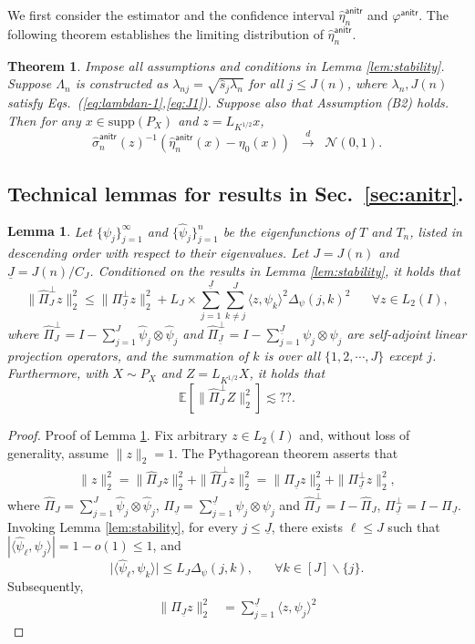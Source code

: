 \documentclass[11pt,a4paper]{article}
\renewcommand{\hat}{\widehat}
\theoremstyle{definition}
\theoremstyle{plain}
\newtheorem{theorem}{Theorem}[section]
\newtheorem{lemma}{Lemma}[section]
\theoremstyle{remark}
\newcommand{\supp}{\mathrm{supp}}
\newcommand{\anitr}{\mathsf{anitr}}
\newcommand{\und}{\underline}
\begin{document}
We first consider the estimator and the confidence interval $\hat\eta_n^\anitr$ and $\varphi^\anitr$. The following theorem establishes the limiting distribution of $\hat\eta_n^\anitr$.
\begin{theorem}
Impose all assumptions and conditions in Lemma \ref{lem:stability}. Suppose $\Lambda_n$ is constructed as $\lambda_{nj}=\sqrt{\hat s_j\lambda_n}$ for all $j\leq J(n)$,
where $\lambda_n,J(n)$ satisfy Eqs.~(\ref{eq:lambdan-1},\ref{eq:J1}). Suppose also that Assumption (B2) holds. Then for any $x\in\supp(P_X)$ and $z=L_{K^{1/2}}x$, 
$$
\hat\sigma_n^\anitr(z)^{-1}(\hat\eta_n^{\anitr}(x)-\eta_0(x)) \;\;\overset{d}{\to}\;\;\mathcal N(0, 1).
$$
\label{thm:anitr-limiting}
\end{theorem}

\subsection{Technical lemmas for results in Sec.~\ref{sec:anitr}.}

\begin{lemma}
Let $\{\psi_j\}_{j=1}^{\infty}$ and $\{\hat\psi_j\}_{j=1}^n$ be the eigenfunctions of $T$ and $T_n$, listed in descending order with respect to their eigenvalues.
Let $J=J(n)$ and $\und J=J(n)/C_J$.
Conditioned on the results in Lemma \ref{lem:stability}, it holds that
$$
\|\hat\Pi_{J}^\perp z\|_2^2 \leq \|\Pi_{\und J}^\perp z\|_2^2 + L_J\times \sum_{j=1}^{\und J}\sum_{k\neq j}^J\langle z,\psi_k\rangle^2\Delta_\psi(j,k)^2\;\;\;\;\;\;\forall z\in L_2(I),
$$
where $\hat\Pi_{J}^\perp = I-\sum_{j=1}^{J}\hat\psi_j\otimes\hat\psi_j$ and $\hat\Pi_{\und J}^\perp = I-\sum_{j=1}^{\und J}\psi_j\otimes\psi_j$ are self-adjoint linear projection operators,
and the summation of $k$ is over all $\{1,2,\cdots,J\}$ except $j$. Furthermore, with $X\sim P_X$ and $Z=L_{K^{1/2}}X$, it holds that
$$
\mathbb E[\|\hat\Pi_J^\perp Z\|_2^2] \lesssim ??.
$$
\label{lem:truncation}
\end{lemma}

\begin{proof}{Proof of Lemma \ref{lem:truncation}.}
Fix arbitrary $z\in L_2(I)$ and, without loss of generality, assume $\|z\|_2=1$.
The Pythagorean theorem asserts that
\begin{align}
\|z\|_2^2 = \|\hat\Pi_{J}z\|_2^2+\|\hat\Pi_{J}^\perp z\|_2^2 = \|\Pi_{\und J}z\|_2^2+\|\Pi_{\und J}^\perp z\|_2^2,
\label{eq:proof-truncation-1}
\end{align}
where $\hat\Pi_J=\sum_{j=1}^J\hat\psi_j\otimes\hat\psi_j$, $\Pi_{\und J}=\sum_{j=1}^{\und J}\psi_j\otimes\psi_j$ and $\hat\Pi_J^\perp=I-\hat\Pi_J$, $\Pi_{\und J}^\perp = I-\Pi_{\und J}$.
Invoking Lemma \ref{lem:stability}, for every $j\leq \und J$, there exists $\ell\leq J$ such that $|\langle\hat\psi_\ell,\psi_j\rangle| = 1-o(1)\leq 1$, and
$$
\big|\langle\hat\psi_\ell, \psi_k\rangle\big| \leq L_J\Delta_\psi(j,k),\;\;\;\;\;\;\forall k\in[J]\backslash\{j\}.
$$
Subsequently,
\begin{align}
\|\Pi_{\und J}z\|_2^2 &= \sum_{j=1}^{\und J}\langle z,\psi_j\rangle^2
\end{align}
\end{proof}
\end{document}
